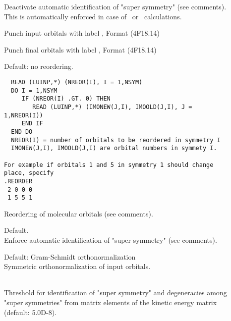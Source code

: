 \begin{description}
\item[]
  Deactivate automatic identification of "super
  symmetry" (see 
  comments). This is automatically enforced in case of \aba\ or
  \resp\ calculations. 

\item[]
  Punch input orbitals with label , Format (4F18.14)
 
\item[]
  Punch final orbitals with label , Format (4F18.14)

\item[]
Default: no reordering.
\begin{verbatim}
  READ (LUINP,*) (NREOR(I), I = 1,NSYM)
  DO I = 1,NSYM
     IF (NREOR(I) .GT. 0) THEN
        READ (LUINP,*) (IMONEW(J,I), IMOOLD(J,I), J = 1,NREOR(I))
     END IF
  END DO
  NREOR(I) = number of orbitals to be reordered in symmetry I
  IMONEW(J,I), IMOOLD(J,I) are orbital numbers in symmety I.

For example if orbitals 1 and 5 in symmetry 1 should change place, specify
.REORDER
 2 0 0 0
 1 5 5 1
\end{verbatim}
  Reordering of molecular orbitals (see comments).
 
\item[]
  Default.\\
  Enforce automatic identification of "super
  symmetry" (see comments). 

\item[]
  Default: Gram-Schmidt orthonormalization\\
  Symmetric orthonormalization of input
  orbitals.
 
\item[]
   \\
  Threshold for identification of "super
  symmetry" and degeneracies among 
  "super symmetries" from matrix elements of the kinetic energy matrix
  (default: 5.0D-8).

\end{description}
 
 

